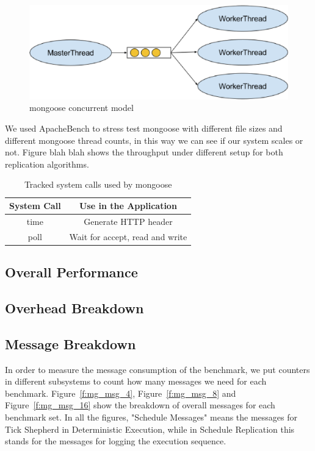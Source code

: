 \begin{figure}
\centering
\includegraphics[width=0.6\columnwidth]{figures/mongoose_model}
\caption{mongoose concurrent model}
\label{f:mongoose_model}
\end{figure}

We used ApacheBench to stress test mongoose with different file sizes and different mongoose thread counts, in this way we can see if our system scales or not. Figure blah blah shows the throughput under different setup for both replication algorithms. 

\begin{table}
\caption{Tracked system calls used by mongoose}
\begin{center}
 \begin{tabular}{c | c}
System Call & Use in the Application\\ \hline
 time & Generate HTTP header  \\ \hline
 poll & Wait for accept, read and write
 \end{tabular}
\end{center}
\label{t:mongoose_syscall}
\end{table}

\subsection{Overall Performance}

\subsection{Overhead Breakdown}

\subsection{Message Breakdown}
In order to measure the message consumption of the benchmark, we put counters in different subsystems to count how many messages we need for each benchmark. Figure~\ref{f:mg_msg_4}, Figure~\ref{f:mg_msg_8} and Figure~\ref{f:mg_msg_16} show the breakdown of overall messages for each benchmark set. In all the figures, "Schedule Messages" means the messages for Tick Shepherd in Deterministic Execution, while in Schedule Replication this stands for the messages for logging the execution sequence.


